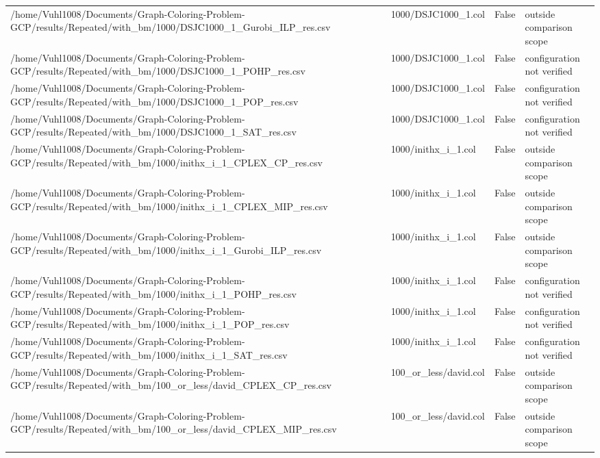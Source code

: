 \begin{table}[htbp]
\begin{tabular}{llll}
/home/Vuhl1008/Documents/Graph-Coloring-Problem-GCP/results/Repeated/with\_bm/1000/DSJC1000\_1\_Gurobi\_ILP\_res.csv & 1000/DSJC1000\_1.col & False & outside comparison scope \\
/home/Vuhl1008/Documents/Graph-Coloring-Problem-GCP/results/Repeated/with\_bm/1000/DSJC1000\_1\_POHP\_res.csv & 1000/DSJC1000\_1.col & False & configuration not verified \\
/home/Vuhl1008/Documents/Graph-Coloring-Problem-GCP/results/Repeated/with\_bm/1000/DSJC1000\_1\_POP\_res.csv & 1000/DSJC1000\_1.col & False & configuration not verified \\
/home/Vuhl1008/Documents/Graph-Coloring-Problem-GCP/results/Repeated/with\_bm/1000/DSJC1000\_1\_SAT\_res.csv & 1000/DSJC1000\_1.col & False & configuration not verified \\
/home/Vuhl1008/Documents/Graph-Coloring-Problem-GCP/results/Repeated/with\_bm/1000/inithx\_i\_1\_CPLEX\_CP\_res.csv & 1000/inithx\_i\_1.col & False & outside comparison scope \\
/home/Vuhl1008/Documents/Graph-Coloring-Problem-GCP/results/Repeated/with\_bm/1000/inithx\_i\_1\_CPLEX\_MIP\_res.csv & 1000/inithx\_i\_1.col & False & outside comparison scope \\
/home/Vuhl1008/Documents/Graph-Coloring-Problem-GCP/results/Repeated/with\_bm/1000/inithx\_i\_1\_Gurobi\_ILP\_res.csv & 1000/inithx\_i\_1.col & False & outside comparison scope \\
/home/Vuhl1008/Documents/Graph-Coloring-Problem-GCP/results/Repeated/with\_bm/1000/inithx\_i\_1\_POHP\_res.csv & 1000/inithx\_i\_1.col & False & configuration not verified \\
/home/Vuhl1008/Documents/Graph-Coloring-Problem-GCP/results/Repeated/with\_bm/1000/inithx\_i\_1\_POP\_res.csv & 1000/inithx\_i\_1.col & False & configuration not verified \\
/home/Vuhl1008/Documents/Graph-Coloring-Problem-GCP/results/Repeated/with\_bm/1000/inithx\_i\_1\_SAT\_res.csv & 1000/inithx\_i\_1.col & False & configuration not verified \\
/home/Vuhl1008/Documents/Graph-Coloring-Problem-GCP/results/Repeated/with\_bm/100\_or\_less/david\_CPLEX\_CP\_res.csv & 100\_or\_less/david.col & False & outside comparison scope \\
/home/Vuhl1008/Documents/Graph-Coloring-Problem-GCP/results/Repeated/with\_bm/100\_or\_less/david\_CPLEX\_MIP\_res.csv & 100\_or\_less/david.col & False & outside comparison scope \\

\end{tabular}
\end{table}
